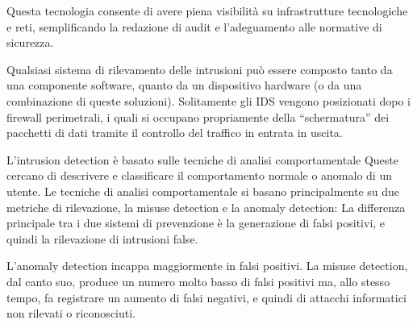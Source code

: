Questa tecnologia consente di avere piena visibilità su infrastrutture tecnologiche e reti, 
semplificando la redazione di audit e l’adeguamento alle normative di sicurezza.

Qualsiasi sistema di rilevamento delle intrusioni può essere composto tanto da una componente software, 
quanto da un dispositivo hardware (o da una combinazione di queste soluzioni).
Solitamente gli IDS vengono posizionati dopo i firewall perimetrali, i quali si occupano propriamente della 
“schermatura” dei pacchetti di dati tramite il controllo del traffico in entrata in uscita.


L’intrusion detection è basato sulle tecniche di analisi comportamentale
Queste cercano di descrivere e classificare il comportamento normale o anomalo di un utente.
Le tecniche di analisi comportamentale si basano principalmente su due metriche di rilevazione, la misuse detection e la anomaly detection:
La differenza principale tra i due sistemi di prevenzione è la generazione di falsi positivi, e quindi la rilevazione di intrusioni false.

L’anomaly detection incappa maggiormente in falsi positivi. 
La misuse detection, dal canto suo, produce un numero molto basso di falsi positivi ma, allo stesso tempo, 
fa registrare un aumento di falsi negativi, e quindi di attacchi informatici non rilevati o riconosciuti.


